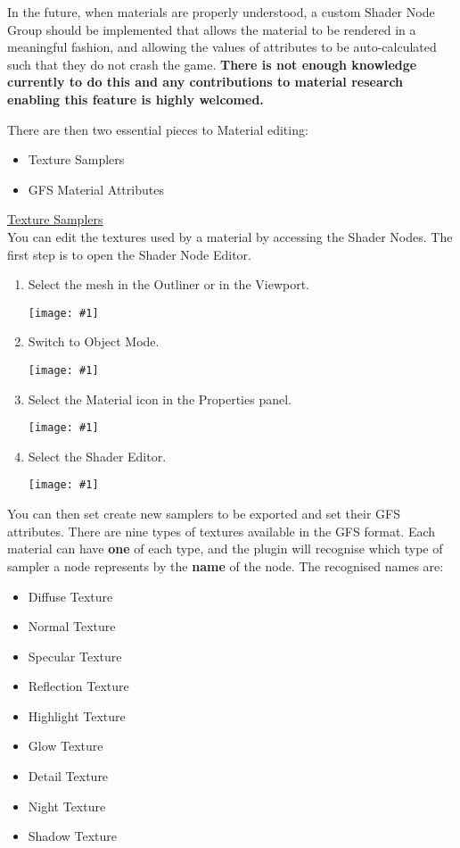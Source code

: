 \documentclass{article}
\newenvironment{guide}[1]
{
	\begin{center}
		\begin{tcolorbox}[%
			colback=black!20, 
			boxrule=0pt, 
			title=Step-by-step: #1,
			enhanced,
			breakable,
			overlay unbroken={%
                \draw[line width=1pt, black, rounded corners]
        	    (frame.north west) rectangle (frame.south east);
			},
    		overlay first={%
        		 \draw[line width=1pt, black, rounded corners]
        	    (frame.south west) -- (frame.north west) -- (frame.north east) -- (frame.south east);
                \draw[line width=1pt, black]
                (frame.south west) -- (frame.south east);
            },
    		overlay middle={%
                \draw[line width=1pt, black]
        	    (frame.north west) rectangle (frame.south east);
        	},
    		overlay last={%
                \draw[line width=1pt, black, rounded corners]
        	    (frame.north west) -- (frame.south west) -- (frame.south east) -- (frame.north east);
                \draw[line width=1pt, black]
                (frame.north west) -- (frame.north east);
           	}
        ]{}
    	\begin{enumerate}
}
{
    		\end{enumerate}
    	\end{tcolorbox}
	\end{center}  	 
}
\newcommand{\guideimage}[1]
{
	\begin{center}
		\texttt{[image: \#1]}
	\end{center}
}
\begin{document}
In the future, when materials are properly understood, a custom Shader Node Group should be implemented that allows the material to be rendered in a meaningful fashion, and allowing the values of attributes to be auto-calculated such that they do not crash the game. \textbf{There is not enough knowledge currently to do this and any contributions to material research enabling this feature is highly welcomed.}

There are then two essential pieces to Material editing:
\begin{itemize}
\item Texture Samplers
\item GFS Material Attributes
\end{itemize}

\noindent\underline{Texture Samplers}\\
You can edit the textures used by a material by accessing the Shader Nodes. The first step is to open the Shader Node Editor.
\begin{guide}{Opening the Shader Node Editor}
\item Select the mesh in the Outliner or in the Viewport.
\guideimage{images/editing_models/edits_select_mesh.png}
\item Switch to Object Mode.
\guideimage{images/editing_models/edits_to_object_mode.png}
\item Select the Material icon in the Properties panel.
\guideimage{images/editing_models/edits_select_material.png}
\item Select the Shader Editor.
\guideimage{images/editing_models/edits_open_shader_nodes.png}
\end{guide}

You can then set create new samplers to be exported and set their GFS attributes. There are nine types of textures available in the GFS format. Each material can have \textbf{one} of each type, and the plugin will recognise which type of sampler a node represents by the \textbf{name} of the node. The recognised names are:
\begin{itemize}
\item Diffuse Texture
\item Normal Texture
\item Specular Texture
\item Reflection Texture
\item Highlight Texture
\item Glow Texture
\item Detail Texture
\item Night Texture
\item Shadow Texture
\end{itemize}
\end{document}
